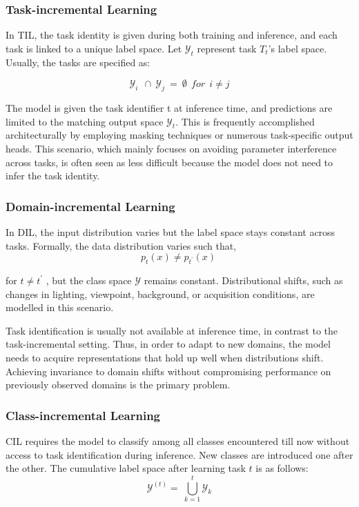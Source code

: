 \documentclass[english, LaM, oneside]{sapthesis}%
\numberwithin{equation}{chapter}
\begin{document}
\subsubsection{Task-incremental Learning}
In TIL, the task identity is given\cite{18} during both training and inference, and each task is linked to a unique label space. Let $\mathcal{Y}_t$ represent task $T_t$’s label space. Usually, the tasks are specified as:

\begin{equation}
    \mathcal{Y}_i{\ \ \cap\ \mathcal{Y}}_j\ =\ \emptyset\ \ for\ \ i\neq j
\end{equation}

The model is given the task identifier t at inference time, and predictions are limited to the matching output space $\mathcal{Y}_t$. This is frequently accomplished architecturally by employing masking techniques or numerous task-specific output heads\cite{2}. This scenario, which mainly focuses on avoiding parameter interference across tasks, is often seen as less difficult because the model does not need to infer the task identity.

\subsubsection{Domain-incremental Learning}
In DIL, the input distribution varies\cite{18} but the label space stays constant across tasks. Formally, the data distribution varies such that,     \begin{equation}
    p_t\left(x\right)\neq p_{t^\prime}\left(x\right)\ 
\end{equation}

for $t\neq t^\prime$ , but the class space $\mathcal{Y}$ remains constant. Distributional shifts, such as changes in lighting, viewpoint, background, or acquisition conditions, are modelled in this scenario.

Task identification is usually not available at inference time, in contrast to the task-incremental setting. Thus, in order to adapt to new domains, the model needs to acquire representations that hold up well when distributions shift. Achieving invariance to domain shifts without compromising performance on previously observed domains is the primary problem.

\subsubsection{Class-incremental Learning}
CIL requires the model to classify among all classes encountered till now without access to task identification during inference. New classes are introduced one after the other. The cumulative label space after learning task $t$ is as follows:
\begin{equation}
    \mathcal{Y}^{\left(t\right)}=\ \bigcup_{k=1}^{t}\mathcal{Y}_k
\end{equation}
\end{document}
